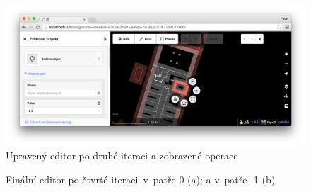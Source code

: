  \begin{figure}
	  \centering
      \includegraphics[width=\textwidth]{img/33-id-iterace-2.png}
      \caption{Upravený editor po druhé iteraci a zobrazené operace}
      \label{obr33}
  \end{figure}


                      \begin{figure}
                    
                    \hfill

                    \caption{Finální editor po čtvrté iteraci~v~patře 0 (a); a v~patře -1 (b)}
                    \label{obr34}
                    \end{figure}
                    

